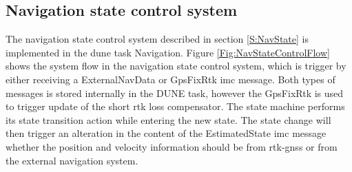 \subsection{Navigation state control system}
The navigation state control system described in section \ref{S:NavState} is implemented in the \gls{dune} task Navigation. Figure \ref{Fig:NavStateControlFlow} shows the system flow in the navigation state control system, which is trigger by either receiving a ExternalNavData or GpsFixRtk \gls{imc} message. Both types of messages is stored internally in the DUNE task, however the GpsFixRtk is used to trigger update of the short rtk loss compensator. The state machine performs its state transition action while entering the new state. The state change will then trigger an alteration in the content of the EstimatedState \gls{imc} message whether the position and velocity information should be from \gls{rtk-gnss} or from the external navigation system.

